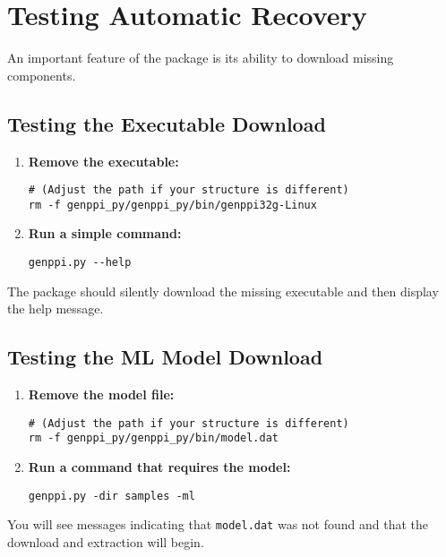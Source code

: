 \documentclass[11pt, a4paper]{article}
\begin{document}
\section{Testing Automatic Recovery}
An important feature of the package is its ability to download missing components.

\subsection{Testing the Executable Download}
\begin{enumerate}
    \item \textbf{Remove the executable:}
    \begin{lstlisting}[style=bashstyle]
# (Adjust the path if your structure is different)
rm -f genppi_py/genppi_py/bin/genppi32g-Linux
    \end{lstlisting}
    \item \textbf{Run a simple command:}
    \begin{lstlisting}[style=bashstyle]
genppi.py --help
    \end{lstlisting}
\end{enumerate}
The package should silently download the missing executable and then display the help message.

\subsection{Testing the ML Model Download}
\begin{enumerate}
    \item \textbf{Remove the model file:}
    \begin{lstlisting}[style=bashstyle]
# (Adjust the path if your structure is different)
rm -f genppi_py/genppi_py/bin/model.dat
    \end{lstlisting}
    \item \textbf{Run a command that requires the model:}
    \begin{lstlisting}[style=bashstyle]
genppi.py -dir samples -ml
    \end{lstlisting}
\end{enumerate}
You will see messages indicating that \texttt{model.dat} was not found and that the download and extraction will begin.
\end{document}
